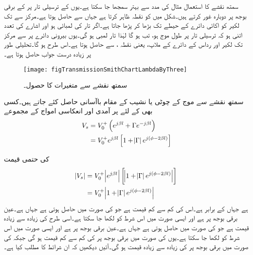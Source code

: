 سمتھ نقشے کا استعمال مثال کی مدد سے بہتر سمجھا جا سکتا ہے۔یوں  کے ترسیلی تار پر  کے برقی بوجھ پر دوبارہ غور کرتے ہیں۔شکل  میں  کو نقطہ  ظاہر کرتا ہے جہاں سے  حاصل ہوتا ہے۔مرکز سے  تک لکیر کو اکائی دائرے کے حیطے تک بڑھا کر  پڑھا جاتا ہے۔اگر تار کی لمبائی  ہو اور اشارے کی تعدد اتنی ہو  کہ ترسیلی تار پر طول موج  ہو، تب  ہو گا لہٰذا تار  لمبی ہو گی۔یوں  بیرونی دائرے پر  سے مرکز تک لکیر  اور  رداس کے دائرے کے ملاپ، یعنی نقطہ ، سے    حاصل ہوتا ہے۔اس طرح  ہو گا۔تحلیلی طور پر زیادہ درست جواب  حاصل ہوتا ہے۔

\begin{figure}
\centering
\texttt{[image: figTransmissionSmithChartLambdaByThree]}
\caption{سمتھ نقشے سے متغیرات کا حصول۔}
\label{شکل_ترسیلی_ایک_تہائی_تار}
\end{figure}

سمتھ نقشے سے موج کے چوٹی یا نشیب کے مقام باآسانی حاصل کئے جاتے ہیں۔کسی بھی  کے لئے  پر آمدی اور انعکاسی امواج کے مجموعے
\begin{align*}
V_s&=V_0^+ \left(e^{j\beta l} +\Gamma e^{-j \beta l}\right)\\
&=V_0^+ e^{j \beta l} \left[1+\abs{\Gamma} e^{j\left(\phi-2 \beta l\right)} \right]
\end{align*}

کی حتمی قیمت
\begin{align*}
\abs{V_s} &=V_0^+ \abs{e^{j\beta l}} \left[\abs{1+\abs{\Gamma} e^{j\left( \phi-2 \beta l\right)} }\right]\\
&=V_0^+\abs{1+\abs{\Gamma} e^{j\left(\phi-2 \beta l\right)} }
\end{align*}
ہے جہاں  کے برابر ہے۔اس کی کم سے کم قیمت  ہے جو  کی صورت میں حاصل ہوتی ہے جہاں  ہے۔عین برقی بوجھ پر  ہے اور ایسی صورت میں اس شرط کو  لکھا جا سکتا ہے۔اسی طرح  کی زیادہ سے زیادہ قیمت  ہے جو  کی صورت میں حاصل ہوتی ہے جہاں  ہے۔عین برقی بوجھ پر  ہے اور ایسی صورت میں اس شرط کو
  لکھا جا سکتا ہے۔یوں  کی صورت میں برقی بوجھ پر  کی کم سے کم قیمت ہو گی جبکہ  کی صورت میں برقی بوجھ پر  کی زیادہ سے زیادہ قیمت ہو گی۔آئیں دیکھیں کہ ان شرائط کا مطلب کیا ہے۔


